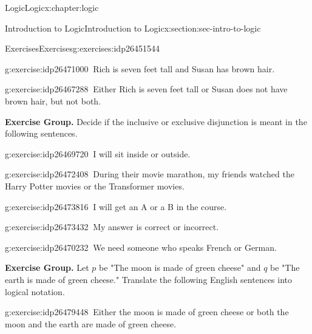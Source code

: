 \documentclass[twoside,10pt,]{book}
\numberwithin{equation}{section}
\begin{document}
\begin{chapterptx}{Logic}{}{Logic}{}{}{x:chapter:logic}
\begin{sectionptx}{Introduction to Logic}{}{Introduction to Logic}{}{}{x:section:sec-intro-to-logic}
\begin{exercises-subsection}{Exercises}{}{Exercises}{}{}{g:exercises:idp26451544}
\begin{exercisegroup}
\begin{divisionexerciseeg}{10}{}{}{g:exercise:idp26471000}%
\(\ \)Rich is seven feet tall and Susan has brown hair.\end{divisionexerciseeg}%
\begin{divisionexerciseeg}{11}{}{}{g:exercise:idp26467288}%
\(\ \)Either Rich is seven feet tall or Susan does not have brown hair, but not both.\end{divisionexerciseeg}%
\end{exercisegroup}
\par\medskip\noindent
\par\medskip\noindent%
\textbf{Exercise Group.}\space\space%
Decide if the inclusive or exclusive disjunction is meant in the following sentences.\begin{exercisegroup}
\begin{divisionexerciseeg}{12}{}{}{g:exercise:idp26469720}%
\(\ \)I will sit inside or outside.\end{divisionexerciseeg}%
\begin{divisionexerciseeg}{13}{}{}{g:exercise:idp26472408}%
\(\ \)During their movie marathon, my friends watched the Harry Potter movies or the Transformer movies.\end{divisionexerciseeg}%
\begin{divisionexerciseeg}{14}{}{}{g:exercise:idp26473816}%
\(\ \)I will get an A or a B in the course.\end{divisionexerciseeg}%
\begin{divisionexerciseeg}{15}{}{}{g:exercise:idp26473432}%
\(\ \)My answer is correct or incorrect.\end{divisionexerciseeg}%
\begin{divisionexerciseeg}{16}{}{}{g:exercise:idp26470232}%
\(\ \)We need someone who speaks French or German.\end{divisionexerciseeg}%
\end{exercisegroup}
\par\medskip\noindent
\par\medskip\noindent%
\textbf{Exercise Group.}\space\space%
Let \(p\) be "The moon is made of green cheese" and \(q\) be "The earth is made of green cheese."  Translate the following English sentences into logical notation.\begin{exercisegroup}
\begin{divisionexerciseeg}{17}{}{}{g:exercise:idp26479448}%
\(\ \)Either the moon is made of green cheese or both the moon and the earth are made of green cheese.\end{divisionexerciseeg}%

\end{exercisegroup}
\end{exercises-subsection}
\end{sectionptx}
\end{chapterptx}
\end{document}
